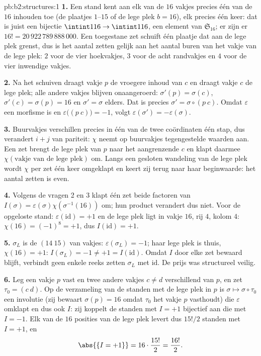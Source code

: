 \begin{solution}{pb:b2:structures:1}
\textbf{1.} Een stand kent aan elk van de $16$ vakjes precies één
van de $16$ inhouden toe (de plaatjes $1$--$15$ of de lege plek $b
= 16$), elk precies één keer: dat is juist een bijectie
$\intint1{16} \to \intint1{16}$, een element van
$\mathfrak{S}_{16}$; er zijn er $16! = 20\,922\,789\,888\,000$.
Een toegestane zet schuift één plaatje dat aan de lege plek grenst,
dus is het aantal zetten gelijk aan het aantal buren van het vakje
van de lege plek: $2$ voor de vier hoekvakjes, $3$ voor de acht
randvakjes en $4$ voor de vier inwendige vakjes.

\textbf{2.} Na het schuiven draagt vakje $p$ de vroegere inhoud van
$c$ en draagt vakje $c$ de lege plek; alle andere vakjes blijven
onaangeroerd: $\sigma'(p) = \sigma(c)$, $\sigma'(c) = \sigma(p) =
16$ en $\sigma' = \sigma$ elders. Dat is precies $\sigma' = \sigma
\circ (p\ c)$. Omdat $\varepsilon$ een morfisme is en
$\varepsilon\bigl((p\ c)\bigr) = -1$, volgt
$\varepsilon(\sigma') = -\varepsilon(\sigma)$.

\textbf{3.} Buurvakjes verschillen precies in één van de twee
coördinaten één stap, dus verandert $i + j$ van pariteit: $\chi$
neemt op buurvakjes tegengestelde waarden aan. Een zet brengt de
lege plek van $p$ naar het aangrenzende $c$ en klapt daarmee
$\chi(\text{vakje van de lege plek})$ om. Langs een gesloten
wandeling van de lege plek wordt $\chi$ per zet één keer omgeklapt
en keert zij terug naar haar beginwaarde: het aantal zetten is
even.

\textbf{4.} Volgens de vragen 2 en 3 klapt één zet beide factoren
van $I(\sigma) = \varepsilon(\sigma)\chi(\sigma^{-1}(16))$ om; hun
product verandert dus niet. Voor de opgeloste stand:
$\varepsilon(\mathrm{id}) = +1$ en de lege plek ligt in vakje $16$,
rij $4$, kolom $4$: $\chi(16) = (-1)^{8} = +1$, dus
$I(\mathrm{id}) = +1$.

\textbf{5.} $\sigma_L$ is de  $(14\ 15)$ van vakjes:
$\varepsilon(\sigma_L) = -1$; haar lege plek is thuis, $\chi(16) =
+1$: $I(\sigma_L) = -1 \neq +1 = I(\mathrm{id})$. Omdat $I$ door
elke zet bewaard blijft, verbindt geen enkele reeks zetten
$\sigma_L$ met $\mathrm{id}$. De prijs was structureel veilig.

\textbf{6.} Leg een vakje $p$ vast en twee andere vakjes $c \neq d$
verschillend van $p$, en zet $\tau_0 = (c\ d)$. Op de verzameling
van de standen met de lege plek in $p$ is $\sigma \mapsto \sigma
\circ \tau_0$ een involutie (zij bewaart $\sigma(p) = 16$ omdat
$\tau_0$ het vakje $p$ vasthoudt) die $\varepsilon$ omklapt en dus
ook $I$: zij koppelt de standen met $I = +1$ bijectief aan die met
$I = -1$. Elk van de $16$ posities van de lege plek levert dus
$15!/2$ standen met $I = +1$, en
\[
\abs{\{I = +1\}} = 16 \cdot \frac{15!}{2} = \frac{16!}{2}.
\]


\end{solution}
